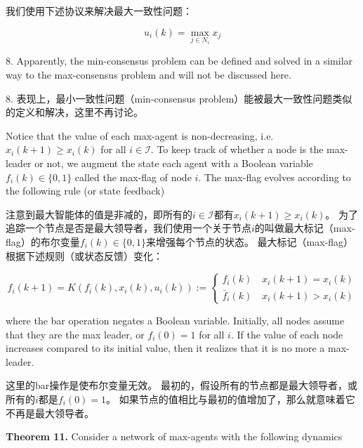 \documentclass{article}
\begin{document}
我们使用下述协议来解决最大一致性问题：

\begin{equation}
    \tag{A4}
    \label{A4}
    u_i(k) = \max_{j\in N_i}x_j
\end{equation}

{\color[gray]{0.5}
 8. Apparently, the min-consensus problem can be deﬁned and solved in a similar way to the max-consensus problem and will not be discussed here.
}

 8. 表现上，最小一致性问题（min-consensus problem）能被最大一致性问题类似的定义和解决，这里不再讨论。

{\color[gray]{0.5}
Notice that the value of each max-agent is non-decreasing, i.e. $x_i(k+1)\ge x_i(k)$ for all $i\in\mathcal{I}$. 
To keep track of whether a node is the max-leader or not, we augment the state each agent with a Boolean variable $f_i(k)\in\{0,1\}$ called the max-ﬂag of node $i$. 
The max-ﬂag evolves according to the following rule (or state feedback)
}

注意到最大智能体的值是非减的，即所有的$i\in\mathcal{I}$都有$x_i(k+1)\ge x_i(k)$。
为了追踪一个节点是否是最大领导者，我们使用一个关于节点$i$的叫做最大标记（max-flag）的布尔变量$f_i(k)\in\{0,1\}$来增强每个节点的状态。
最大标记（max-flag）根据下述规则（或状态反馈）变化：

\begin{equation}
    \tag{43}
    \label{43}
    f_i(k+1) = K(f_i(k),x_i(k),u_i(k)):=
    \left\{
        \begin{matrix}
            f_i(k)\quad x_i(k+1)=x_i(k)\\
            \bar{f}_i(k) \quad x_i(k+1)>x_i(k)
        \end{matrix}
    \right.
\end{equation}

{\color[gray]{0.5}
\noindent where the bar operation negates a Boolean variable. 
Initially, all nodes assume that they are the max leader, or $f_i(0)=1$ for all $i$. 
If the value of each node increases compared to its initial value, then it realizes that it is no more a max-leader.
}

\noindent 这里的bar操作是使布尔变量无效。
最初的，假设所有的节点都是最大领导者，或所有的$i$都是$f_i(0)=1$。
如果节点的值相比与最初的值增加了，那么就意味着它不再是最大领导者。

{\color[gray]{0.5}
\noindent\textbf{Theorem 11.} Consider a network of max-agents with the following dynamics
}
\end{document}
